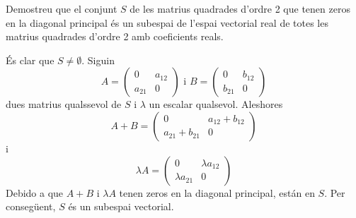 \begin{exemple}
Demostreu que el conjunt $S$ de les matrius quadrades d’ordre 2 que
tenen zeros en la diagonal principal és un subespai de l’espai vectorial
real de totes les matrius quadrades d’ordre 2 amb coeficients reals.

\end{exemple}
\begin{solucio}
És clar que $S\neq \emptyset $. Siguin 
\begin{equation*}
A=\left( 
\begin{array}{cc}
0 & a_{12} \\ 
a_{21} & 0%
\end{array}%
\right) \text{ \ \ \ i \ \ \ }B=\left( 
\begin{array}{cc}
0 & b_{12} \\ 
b_{21} & 0%
\end{array}%
\right)
\end{equation*}%
dues matrius qualssevol de $S$ i $\lambda $ un escalar qualsevol. Aleshores%
\begin{equation*}
A+B=\left( 
\begin{array}{cc}
0 & a_{12}+b_{12} \\ 
a_{21}+b_{21} & 0%
\end{array}%
\right)
\end{equation*}%
i%
\begin{equation*}
\lambda A=\left( 
\begin{array}{cc}
0 & \lambda a_{12} \\ 
\lambda a_{21} & 0%
\end{array}%
\right)
\end{equation*}%
Debido a que $A+B$ i $\lambda A$ tenen zeros en la diagonal principal, están en $S$. Per consegüent, $S$ és un subespai vectorial.
\end{solucio}

